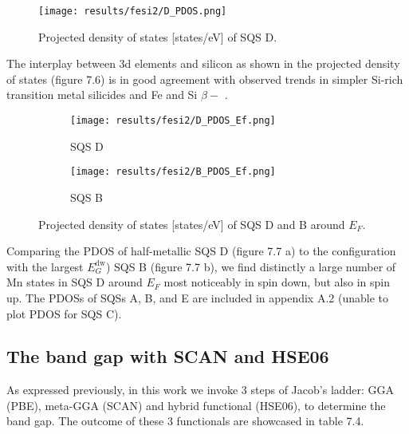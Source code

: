 \begin{figure}[H]
	\centering
	\texttt{[image: results/fesi2/D\_PDOS.png]}
	\caption{Projected density of states [states/eV] of SQS D.}
\end{figure} 

The interplay between 3d elements and silicon as shown in the projected density of states (figure 7.6) is in good agreement with observed trends in simpler Si-rich transition metal silicides \cite{lange1997electronic} and Fe and Si $\beta-$  \cite{doi:10.1063/1.346415}.

\begin{figure}[H]
	\begin{subfigure}{.5\textwidth}
			\texttt{[image: results/fesi2/D\_PDOS\_Ef.png]}
			\caption{SQS D}		
	\end{subfigure}
	\begin{subfigure}{.5\textwidth}
		\texttt{[image: results/fesi2/B\_PDOS\_Ef.png]}
		\caption{SQS B}		
	\end{subfigure}
	\caption{Projected density of states [states/eV] of SQS D and B around $E_F$.}
\end{figure}

Comparing the PDOS of half-metallic SQS D (figure 7.7 a) to the configuration with the largest $E_G ^\text{dw}$) SQS B (figure 7.7 b), we find distinctly a large number of Mn states in SQS D around $E_F$ most noticeably in spin down, but also in spin up. The PDOSs of SQSs A, B, and E are included in appendix A.2 (unable to plot PDOS for SQS C).

\subsection{The band gap with SCAN and HSE06}
As expressed previously, in this work we invoke 3 steps of Jacob's ladder: GGA (PBE), meta-GGA (SCAN) and hybrid functional (HSE06), to determine the band gap. The outcome of these 3 functionals are showcased in table 7.4.

